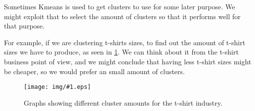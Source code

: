 \documentclass[10pt]{extarticle}
\newcommand{\stdfig}[2]{
    \begin{figure}
    \centering
    \texttt{[image: img/\#1.eps]}
    \caption{#2}
    \label{fig:#1}
    \end{figure}
}
\begin{document}
Sometimes Kmeans is used to get clusters to use for some later purpose.
We might exploit that to select the amount of clusters so that it
performs well for that purpose.

For example, if we are clustering t-shirts sizes, to find out the amount
of t-shirt sizes we have to produce, as seen in
\cref{fig:t_shirt_clustering}. We can think about it from the t-shirt
business point of view, and we might conclude that having less t-shirt
sizes might be cheaper, so we would prefer an small amount of clusters.

\stdfig{t_shirt_clustering}{Graphs showing different cluster amounts for the t-shirt industry.}




    \nocite{*}



\end{document}
